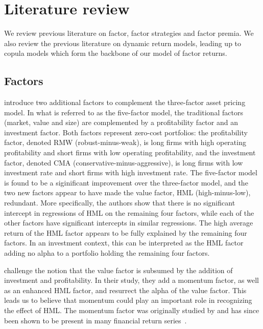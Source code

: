 \section{Literature review}
\label{sec:literature}

We review previous literature on factor, factor strategies and factor premia. We also review the previous literature on dynamic return models, leading up to copula models which form the backbone of our model of factor returns.

\subsection{Factors}

\textcite{FF2015} introduce two additional factors to complement the \textcite{FamaFrench1993} three-factor asset pricing model. In what is referred to as the five-factor model, the traditional factors (market, value and size) are complemented by a profitability factor and an investment factor. Both factors represent zero-cost portfolios: the profitability factor, denoted RMW (robust-minus-weak), is long firms with high operating profitability and short firms with low operating profitability, and the investment factor, denoted CMA (conservative-minus-aggressive), is long firms with low investment rate and short firms with high investment rate. The five-factor model is found to be a siginificant improvement over the three-factor model, and the two new factors appear to have made the value factor, HML (high-minus-low), redundant. More specifically, the authors show that there is no significant intercept in regressions of HML on the remaining four factors, while each of the other factors have significant intercepts in similar regressions. The high average return of the HML factor appears to be fully explained by the remaining four factors. In an investment context, this can be interpreted as the HML factor adding no alpha to a portfolio holding the remaining four factors.

\textcite{Asness2015} challenge the notion that the value factor is subsumed by the addition of investment and profitability. In their study, they add a momentum factor, as well as an enhanced HML factor, and resurrect the alpha of the value factor. This leads us to believe that momentum could play an important role in recognizing the effect of HML. The momentum factor was originally studied by \textcite{JegadeeshTitman1993} and has since been shown to be present in many financial return series~\autocite{AsnessMoskovitzPedersen2013}.

